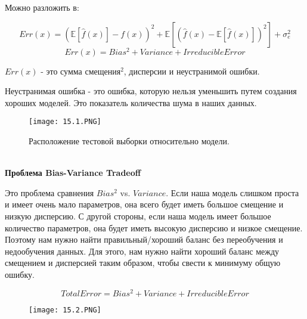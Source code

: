Можно разложить в:

$$Err(x) = (\mathbb{E}[\hat{f}(x)] - f(x))^2 + \mathbb{E}[(\hat{f}(x) - \mathbb{E}[\hat{f}(x)])^2] + \sigma^2_{e}$$
$$Err(x) = Bias^2 + Variance + Irreducible Error$$

$Err(x)$ - это сумма смещения$^2$, дисперсии и неустранимой ошибки.

Неустранимая ошибка - это ошибка, которую нельзя уменьшить путем создания хороших моделей. Это показатель количества шума в наших данных.

\begin{figure}[h]
\centering
\texttt{[image: 15.1.PNG]}
\caption{Расположение тестовой выборки относительно модели.}
\end{figure}
\\
\textbf{Проблема Bias-Variance Tradeoff}

Это проблема сравнения $Bias^2$ vs. $Variance$. Если наша модель слишком проста и имеет очень мало параметров, она всего будет иметь большое смещение и низкую дисперсию. С другой стороны, если наша модель имеет большое количество параметров, она будет иметь высокую дисперсию и низкое смещение. Поэтому нам нужно найти правильный/хороший баланс без переобучения и недообучения данных. Для этого, нам нужно найти хороший баланс между смещением и дисперсией таким образом, чтобы свести к минимуму общую ошибку.

$$TotalError = Bias^2 + Variance + Irreducible Error$$

\begin{figure}[H]
\centering
\texttt{[image: 15.2.PNG]}
\caption{}
\end{figure}